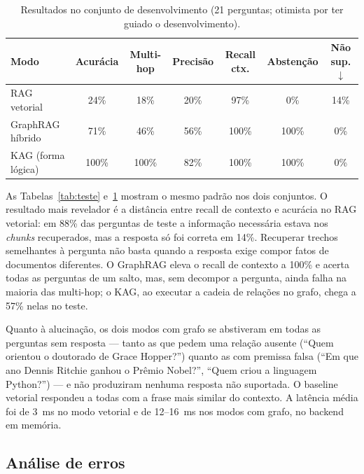 \documentclass[12pt]{article}
\begin{document}
\begin{table}[ht]
\centering
\caption{Resultados no conjunto de desenvolvimento (21 perguntas; otimista por ter guiado o desenvolvimento).}
\label{tab:dev}
{\small\setlength{\tabcolsep}{4pt}\begin{tabular}{lcccccc}
\toprule
Modo & Acurácia & Multi-hop & Precisão & Recall ctx. & Abstenção & Não sup.$\downarrow$ \\
\midrule
RAG vetorial & 24\% & 18\% & 20\% & 97\% & 0\% & 14\% \\
GraphRAG híbrido & 71\% & 46\% & 56\% & 100\% & 100\% & 0\% \\
KAG (forma lógica) & 100\% & 100\% & 82\% & 100\% & 100\% & 0\% \\
\bottomrule
\end{tabular}}
\end{table}

As Tabelas~\ref{tab:teste} e~\ref{tab:dev} mostram o mesmo padrão nos dois conjuntos. O resultado mais revelador é a distância entre recall de contexto e acurácia no RAG vetorial: em 88\% das perguntas de teste a informação necessária estava nos \textit{chunks} recuperados, mas a resposta só foi correta em 14\%. Recuperar trechos semelhantes à pergunta não basta quando a resposta exige compor fatos de documentos diferentes. O GraphRAG eleva o recall de contexto a 100\% e acerta todas as perguntas de um salto, mas, sem decompor a pergunta, ainda falha na maioria das multi-hop; o KAG, ao executar a cadeia de relações no grafo, chega a 57\% nelas no teste.

Quanto à alucinação, os dois modos com grafo se abstiveram em todas as perguntas sem resposta --- tanto as que pedem uma relação ausente (``Quem orientou o doutorado de Grace Hopper?'') quanto as com premissa falsa (``Em que ano Dennis Ritchie ganhou o Prêmio Nobel?'', ``Quem criou a linguagem Python?'') --- e não produziram nenhuma resposta não suportada. O baseline vetorial respondeu a todas com a frase mais similar do contexto. A latência média foi de 3~ms no modo vetorial e de 12--16~ms nos modos com grafo, no backend em memória.

\subsection{Análise de erros}
\end{document}
